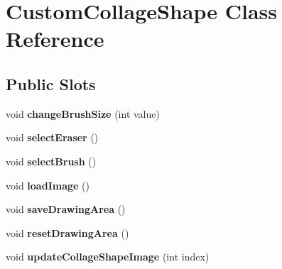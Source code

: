 \hypertarget{class_custom_collage_shape}{
\section{CustomCollageShape Class Reference}
\label{class_custom_collage_shape}
}
\subsection*{Public Slots}
\begin{DoxyCompactItemize}
\item 
\hypertarget{class_custom_collage_shape_a91e87a72f6922526275e8fe59196556f}{
void {\bfseries changeBrushSize} (int value)}
\label{class_custom_collage_shape_a91e87a72f6922526275e8fe59196556f}

\item 
\hypertarget{class_custom_collage_shape_ae40cfeeca67404d1520071a7facac287}{
void {\bfseries selectEraser} ()}
\label{class_custom_collage_shape_ae40cfeeca67404d1520071a7facac287}

\item 
\hypertarget{class_custom_collage_shape_ab5c62708a914aae49d3c0874e03bff9a}{
void {\bfseries selectBrush} ()}
\label{class_custom_collage_shape_ab5c62708a914aae49d3c0874e03bff9a}

\item 
\hypertarget{class_custom_collage_shape_a525522ba890654d7748da6bba262829b}{
void {\bfseries loadImage} ()}
\label{class_custom_collage_shape_a525522ba890654d7748da6bba262829b}

\item 
\hypertarget{class_custom_collage_shape_a1535d7f5edaea1a85a0184b7ec30659b}{
void {\bfseries saveDrawingArea} ()}
\label{class_custom_collage_shape_a1535d7f5edaea1a85a0184b7ec30659b}

\item 
\hypertarget{class_custom_collage_shape_a71e386ff541e3085ac222469c37bb17d}{
void {\bfseries resetDrawingArea} ()}
\label{class_custom_collage_shape_a71e386ff541e3085ac222469c37bb17d}

\item 
\hypertarget{class_custom_collage_shape_ad78c8e3adee1d88ad69e3e484ad8d55f}{
void {\bfseries updateCollageShapeImage} (int index)}
\label{class_custom_collage_shape_ad78c8e3adee1d88ad69e3e484ad8d55f}

\end{DoxyCompactItemize}
